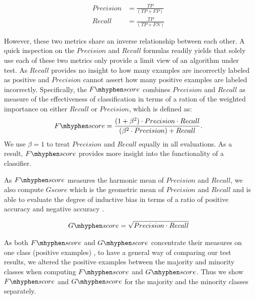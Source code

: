 \documentclass{iitthesis}
\newcommand\fscore{\mathop{F\mhyphen score}}
\newcommand\gscore{\mathop{G\mhyphen score}}
\begin{document}
\begin{align*}
Precision &= \frac{TP}{(TP + FP)}\\
Recall &= \frac{TP}{(TP+FN)}  
\end{align*}

However, these two metrics share an inverse relationship between each other. A quick inspection on the $Precision$ and $Recall$ formulas readily yields that solely use each of these two metrics only provide a limit view of an algorithm under test. As $Recall$ provides no insight to how many examples are incorrectly labeled as positive and $Precision$ cannot assert how many positive examples are labeled incorrectly. Specifically, the $\fscore$ combines $Precision$ and $Recall$ as measure of the effectiveness of classification in terms of a ration of the weighted importance on either $Recall$ or $Precision$, which is defined as:
\begin{align*}
\fscore = \frac{(1+\beta^2)\cdot Precision \cdot Recall}{(\beta^2\cdot Precision)+ Recall}.
\end{align*}
We use $\beta=1$ to treat $Precision$ and $Recall$ equally in all evaluations. As a result, $\fscore$ provides more insight into the functionality of a classifier.

As $\fscore$ measures the harmonic mean of $Precision$ and $Recall$, we also compute $Gscore$ which is the geometric mean of $Precision$ and $Recall$ and is able to evaluate the degree of inductive bias in terms of a ratio of positive accuracy and negative accuracy \cite{HH:09}.

\begin{align*}
\gscore=\sqrt{Precision \cdot Recall}
\end{align*}

As both $\fscore$ and $\gscore$ concentrate their measures on one class (positive examples) \cite{sokolova2006beyond}, to have a general way of comparing our test results, we altered the positive examples between the majority and minority classes when computing $\fscore$ and $\gscore$. Thus we show $\fscore$ and $\gscore$ for the majority and the minority classes separately.
\end{document}
